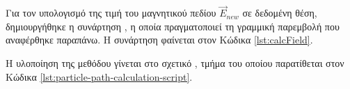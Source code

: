 Για τον υπολογισμό της τιμή του μαγνητικού πεδίου $\vec{E}_{new}$ σε δεδομένη θέση, δημιουργήθηκε η συνάρτηση  , η οποία πραγματοποιεί τη γραμμική παρεμβολή που αναφέρθηκε παραπάνω. 
Η συνάρτηση  φαίνεται στον Κώδικα \ref{lst:calcField}.



Η υλοποίηση της μεθόδου γίνεται στο σχετικό , τμήμα του οποίου παρατίθεται στον Κώδικα \ref{lst:particle-path-calculation-script}.




%



